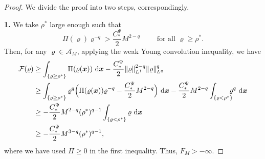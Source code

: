 \documentclass[reqno,11pt]{amsart}
\numberwithin{equation}{section}
\theoremstyle{definition}
\def\dd{{\, \rm d}}
\begin{document}
\begin{proof} We divide the proof into two steps, correspondingly.
    
\smallskip
{\bf 1.} We take $\rho^*$ large enough such that
\[
\Pi(\varrho) \varrho^{-q} > \frac{C_*^\Psi}{2} M^{2-q}
\qquad\mbox{ for all $\varrho \geq \rho^*$}.
\]
Then, for any $\varrho \in \mathcal{A}_M$, applying the weak Young convolution inequality, 
we have 
\begin{align*}
\mathcal{F}(\varrho) & \geq \int_{\{ \varrho \geq \rho^* \}} \Pi(\varrho(\boldsymbol{x}))\,\dd\boldsymbol{x} - \frac{C_*^\Psi}{2} \| \varrho \|_{L^1}^{2-q} \| \varrho \|_{L^q}^q \nonumber\\
& \geq \int_{\{ \varrho \geq \rho^* \}} \varrho^q \Big ( \Pi(\varrho(\boldsymbol{x})) \varrho^{-q} - \frac{C_*^\Psi}{2} M^{2-q} \Big ) \,\dd\boldsymbol{x} - \frac{C_*^\Psi}{2} M^{2-q} \int_{\{ \varrho < \rho^* \}} \!\!\!\!\varrho^q \,\dd\boldsymbol{x} \nonumber\\
& \geq - \frac{C_*^\Psi}{2} M^{2-q} (\rho^*)^{q-1} \int_{\{ \varrho < \rho^* \}} \varrho \,\dd\boldsymbol{x} \\
& \geq - \frac{C_*^\Psi}{2} M^{3-q} (\rho^*)^{q-1} \nonumber,
\end{align*}
where we have used $\Pi\geq 0$ in the first inequality. Thus, $F_M > - \infty.$


\end{proof}
\end{document}
